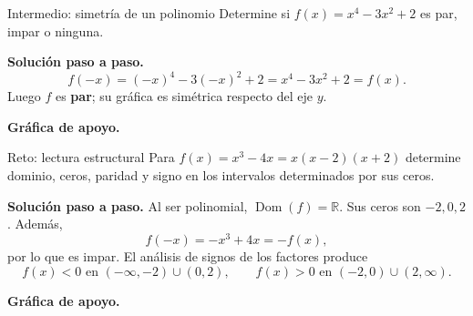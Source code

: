 \documentclass[aspectratio=169,10pt]{beamer}
\newcommand{\R}{\mathbb{R}}
\newcommand{\Dom}{\operatorname{Dom}}
\begin{document}
\begin{frame}{Intermedio: simetría de un polinomio}
Determine si $f(x)=x^4-3x^2+2$ es par, impar o ninguna.

\textbf{Solución paso a paso.}
\[
f(-x)=(-x)^4-3(-x)^2+2=x^4-3x^2+2=f(x).
\]
Luego $f$ es \textbf{par}; su gráfica es simétrica respecto del eje $y$.


\textbf{Gráfica de apoyo.}\medskip
\begin{center}
\end{center}

\end{frame}

\begin{frame}{Reto: lectura estructural}
Para $f(x)=x^3-4x=x(x-2)(x+2)$ determine dominio, ceros, paridad y signo en los intervalos determinados por sus ceros.

\textbf{Solución paso a paso.} Al ser polinomial, $\Dom(f)=\R$. Sus ceros son $-2,0,2$. Además,
\[
f(-x)=-x^3+4x=-f(x),
\]
por lo que es impar. El análisis de signos de los factores produce
\[
f(x)<0\text{ en }(-\infty,-2)\cup(0,2),
\qquad
f(x)>0\text{ en }(-2,0)\cup(2,\infty).
\]


\textbf{Gráfica de apoyo.}\medskip
\begin{center}
\end{center}

\end{frame}
\end{document}
